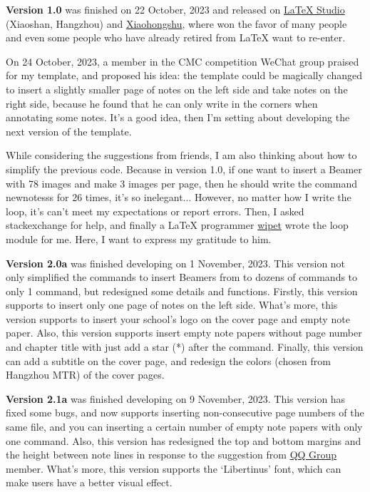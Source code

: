 \documentclass[11pt]{article}
\def\cmd#1{\texorpdfstring{\textcolor{cmdcolor}{\textsf{#1}}}{“#1”}}
\begin{document}
\textsf{\bfseries Version 1.0} was finished on 22 October, 2023 and released on \href{https://www.latexstudio.net/index/details/index/mid/3720.html}{LaTeX Studio} (Xiaoshan, Hangzhou) and \href{https://www.xiaohongshu.com/user/profile/61e7ad870000000010005642}{Xiaohongshu}, where won the favor of many people and even some people who have already retired from \textsf\LaTeX{} want to re-enter.

On 24 October, 2023, a member in the CMC competition WeChat group praised for my template, and proposed his idea: the template could be magically changed to insert a slightly smaller page of notes on the left side and take notes on the right side, because he found that he can only write in the corners when annotating some notes. It's a good idea, then I'm setting about developing the next version of the template.

While considering the suggestions from friends, I am also thinking about how to simplify the previous code. Because in version 1.0, if one want to insert a Beamer with 78 images and make 3 images per page, then he should write the command \cmd{newnotesss} for 26 times, it's so inelegant... However, no matter how I write the loop, it's can't meet my expectations or report errors. Then, I asked stackexchange for help, and finally a LaTeX programmer \href{https://tex.stackexchange.com/users/51799/wipet}{wipet} wrote the loop module for me. Here, I want to express my gratitude to him.

\textsf{\bfseries Version 2.0a} was finished developing on 1 November, 2023. This version not only simplified the commands to insert Beamers from to dozens of commands to only 1 command, but redesigned some details and functions. Firstly, this version supports to insert only one page of notes on the left side. What's more, this version supports to insert your school's logo on the cover page and empty note paper. Also, this version supports insert empty note papers without page number and chapter title with just add a star (*) after the command. Finally, this version can add a subtitle on the cover page, and redesign the colors (chosen from Hangzhou MTR) of the cover pages.

\textsf{\bfseries Version 2.1a} was finished developing on 9 November, 2023. This version has fixed some bugs, and now supports inserting non-consecutive page numbers of the same file, and you can inserting a certain number of empty note papers with only one command. Also, this version has redesigned the top and bottom margins and the height between note lines in response to the suggestion from \href{https://qm.qq.com/q/OnHzbNvVAG}{QQ Group} member. What's more, this version supports the `Libertinus' font, which can make users have a better visual effect.
\end{document}
